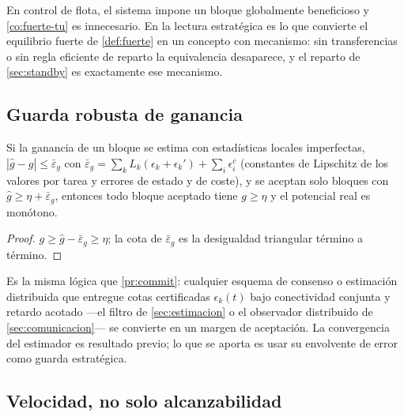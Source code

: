 \begin{observacion}
\label{obs:flota-vs-estrategico}
En control de flota, el sistema impone un bloque globalmente beneficioso y
\cref{co:fuerte-tu} es innecesario. En la lectura estratégica es lo que
convierte el equilibrio fuerte de \cref{def:fuerte} en un concepto con
mecanismo: sin transferencias o sin regla eficiente de reparto la equivalencia
desaparece, y el reparto de \cref{sec:standby} es exactamente ese mecanismo.
\end{observacion}

\subsection{Guarda robusta de ganancia}

\begin{proposicion}
\label{pr:guarda-ganancia}
Si la ganancia de un bloque se estima con estadísticas locales imperfectas,
$|\hat g-g|\le\bar\varepsilon_g$ con
$\bar\varepsilon_g=\sum_kL_k(\epsilon_k+\epsilon_k')+\sum_i\epsilon_i^{c}$
(constantes de Lipschitz de los valores por tarea y errores de estado y de
coste), y se aceptan solo bloques con $\hat g\ge\eta+\bar\varepsilon_g$,
entonces todo bloque aceptado tiene $g\ge\eta$ y el potencial real es monótono.
\end{proposicion}

\begin{proof}
$g\ge\hat g-\bar\varepsilon_g\ge\eta$; la cota de $\bar\varepsilon_g$ es la
desigualdad triangular término a término.
\end{proof}

\begin{observacion}
\label{obs:guarda-envolvente}
Es la misma lógica que \cref{pr:commit}: cualquier esquema de consenso o
estimación distribuida que entregue cotas certificadas $\epsilon_k(t)$ bajo
conectividad conjunta y retardo acotado —el filtro de \cref{sec:estimacion} o
el observador distribuido de \cref{sec:comunicacion}— se convierte en un
margen de aceptación. La convergencia del estimador es resultado previo; lo
que se aporta es usar su envolvente de error como guarda estratégica.
\end{observacion}

\subsection{Velocidad, no solo alcanzabilidad}

